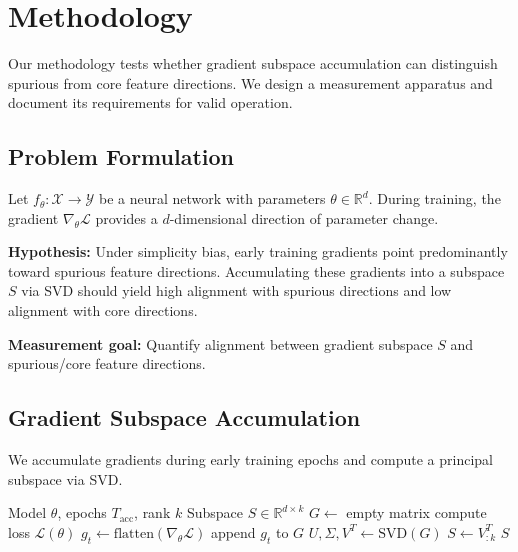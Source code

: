 \section{Methodology}

Our methodology tests whether gradient subspace accumulation can distinguish spurious from core feature directions. We design a measurement apparatus and document its requirements for valid operation.

\subsection{Problem Formulation}

Let $f_\theta: \mathcal{X} \to \mathcal{Y}$ be a neural network with parameters $\theta \in \mathbb{R}^d$. During training, the gradient $\nabla_\theta \mathcal{L}$ provides a $d$-dimensional direction of parameter change.

\textbf{Hypothesis:} Under simplicity bias, early training gradients point predominantly toward spurious feature directions. Accumulating these gradients into a subspace $S$ via SVD should yield high alignment with spurious directions and low alignment with core directions.

\textbf{Measurement goal:} Quantify alignment between gradient subspace $S$ and spurious/core feature directions.

\subsection{Gradient Subspace Accumulation}

We accumulate gradients during early training epochs and compute a principal subspace via SVD.

\begin{algorithm}[h]
\caption{Gradient Subspace Computation}
\begin{algorithmic}[1]
\REQUIRE Model $\theta$, epochs $T_{\text{acc}}$, rank $k$
\ENSURE Subspace $S \in \mathbb{R}^{d \times k}$
\STATE $G \leftarrow$ empty matrix
        \STATE compute loss $\mathcal{L}(\theta)$
        \STATE $g_t \leftarrow \text{flatten}(\nabla_\theta \mathcal{L})$
        \STATE append $g_t$ to $G$
    \ENDFOR
\ENDFOR
\STATE $U, \Sigma, V^T \leftarrow \text{SVD}(G)$
\STATE $S \leftarrow V_{:k}^T$
\RETURN $S$
\end{algorithmic}
\end{algorithm}


